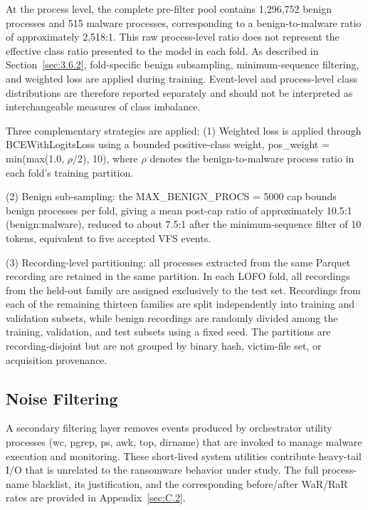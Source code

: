 At the process level, the complete pre-filter pool contains 1,296,752 benign processes and 515 malware processes, corresponding to a benign-to-malware ratio of approximately 2,518:1. This raw process-level ratio does not represent the effective class ratio presented to the model in each fold. As described in Section~\ref{sec:3.6.2}, fold-specific benign subsampling, minimum-sequence filtering, and weighted loss are applied during training. Event-level and process-level class distributions are therefore reported separately and should not be interpreted as interchangeable measures of class imbalance.

Three complementary strategies are applied: 
(1) Weighted loss is applied through BCEWithLogitsLoss using a bounded positive-class weight, pos\_\allowbreak{}weight = min(max(1.0, $\rho$/\allowbreak{}2), 10), where $\rho$ denotes the benign-to-malware process ratio in each fold's training partition.

(2) Benign sub-sampling: the MAX\_\allowbreak{}BENIGN\_\allowbreak{}PROCS = 5000 cap bounds benign processes per fold, giving a mean post-cap ratio of approximately 10.5:1 (benign:malware), reduced to about 7.5:1 after the minimum-sequence filter of 10 tokens, equivalent to five accepted VFS events.

(3) Recording-level partitioning: all processes extracted from the same Parquet recording are retained in the same partition. In each LOFO fold, all recordings from the held-out family are assigned exclusively to the test set. Recordings from each of the remaining thirteen families are split independently into training and validation subsets, while benign recordings are randomly divided among the training, validation, and test subsets using a fixed seed. The partitions are recording-disjoint but are not grouped by binary hash, victim-file set, or acquisition provenance.

\subsection{Noise Filtering}\label{sec:3.3.6}

A secondary filtering layer removes events produced by orchestrator utility processes (wc, pgrep, ps, awk, top, dirname) that are invoked to manage malware execution and monitoring. These short-lived system utilities contribute heavy-tail I/\allowbreak{}O that is unrelated to the ransomware behavior under study. The full process-name blacklist, its justification, and the corresponding before/\allowbreak{}after WaR/\allowbreak{}RaR rates are provided in Appendix~\ref{sec:C.2}.

